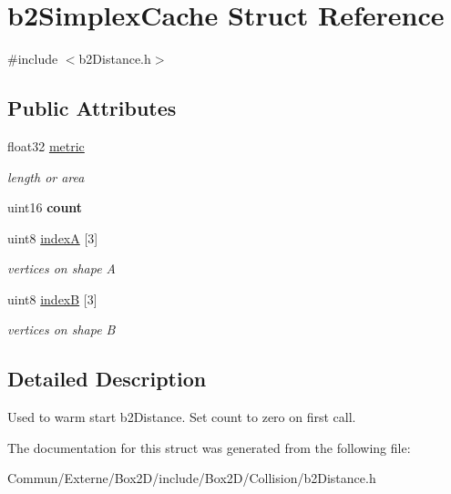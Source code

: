 \hypertarget{structb2_simplex_cache}{}\section{b2\+Simplex\+Cache Struct Reference}
\label{structb2_simplex_cache}


{\ttfamily \#include $<$b2\+Distance.\+h$>$}

\subsection*{Public Attributes}
\begin{DoxyCompactItemize}
\item 
float32 \hyperlink{structb2_simplex_cache_a018e0a500b417d79bfed3f21310b15a2}{metric}\hypertarget{structb2_simplex_cache_a018e0a500b417d79bfed3f21310b15a2}{}\label{structb2_simplex_cache_a018e0a500b417d79bfed3f21310b15a2}

\begin{DoxyCompactList}\small\item\em length or area \end{DoxyCompactList}\item 
uint16 {\bfseries count}\hypertarget{structb2_simplex_cache_a5ef63839988cc06210ae76bcef96f56c}{}\label{structb2_simplex_cache_a5ef63839988cc06210ae76bcef96f56c}

\item 
uint8 \hyperlink{structb2_simplex_cache_ab574159e69dda7e14ead8de848ca6b67}{indexA} \mbox{[}3\mbox{]}\hypertarget{structb2_simplex_cache_ab574159e69dda7e14ead8de848ca6b67}{}\label{structb2_simplex_cache_ab574159e69dda7e14ead8de848ca6b67}

\begin{DoxyCompactList}\small\item\em vertices on shape A \end{DoxyCompactList}\item 
uint8 \hyperlink{structb2_simplex_cache_ab7586465ee2c5f7c3bdd8f80d5e256a7}{indexB} \mbox{[}3\mbox{]}\hypertarget{structb2_simplex_cache_ab7586465ee2c5f7c3bdd8f80d5e256a7}{}\label{structb2_simplex_cache_ab7586465ee2c5f7c3bdd8f80d5e256a7}

\begin{DoxyCompactList}\small\item\em vertices on shape B \end{DoxyCompactList}\end{DoxyCompactItemize}


\subsection{Detailed Description}
Used to warm start b2\+Distance. Set count to zero on first call. 

The documentation for this struct was generated from the following file\+:\begin{DoxyCompactItemize}
\item 
Commun/\+Externe/\+Box2\+D/include/\+Box2\+D/\+Collision/b2\+Distance.\+h\end{DoxyCompactItemize}
